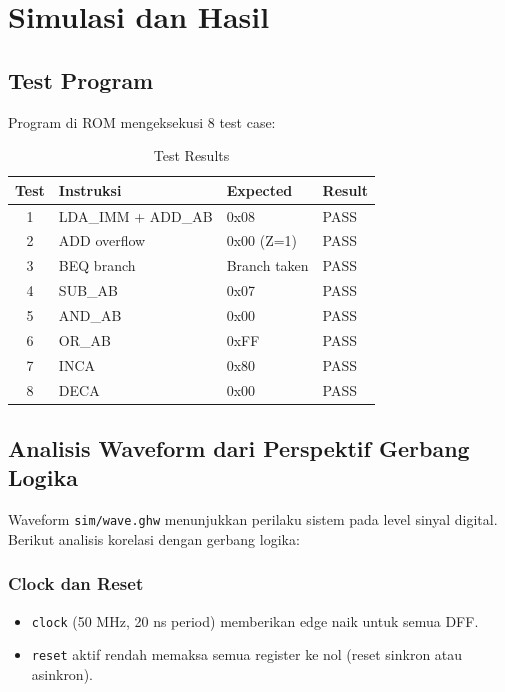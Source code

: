 \documentclass[12pt,a4paper]{report}
\begin{document}
\chapter{Simulasi dan Hasil}

\section{Test Program}

Program di ROM mengeksekusi 8 test case:

\begin{table}[H]
  \centering
  \small
  \begin{tabular}{|c|l|l|l|}
    \hline
    \textbf{Test} & \textbf{Instruksi} & \textbf{Expected} & \textbf{Result} \\
    \hline
    1 & LDA\_IMM + ADD\_AB & 0x08 & PASS \\
    2 & ADD overflow & 0x00 (Z=1) & PASS \\
    3 & BEQ branch & Branch taken & PASS \\
    4 & SUB\_AB & 0x07 & PASS \\
    5 & AND\_AB & 0x00 & PASS \\
    6 & OR\_AB & 0xFF & PASS \\
    7 & INCA & 0x80 & PASS \\
    8 & DECA & 0x00 & PASS \\
    \hline
  \end{tabular}
  \caption{Test Results}
\end{table}

\section{Analisis Waveform dari Perspektif Gerbang Logika}

Waveform \texttt{sim/wave.ghw} menunjukkan perilaku sistem pada level sinyal digital. Berikut analisis korelasi dengan gerbang logika:

\subsection{Clock dan Reset}

\begin{itemize}
  \item \texttt{clock} (50 MHz, 20 ns period) memberikan edge naik untuk semua DFF.
  \item \texttt{reset} aktif rendah memaksa semua register ke nol (reset sinkron atau asinkron).
\end{itemize}
\end{document}
